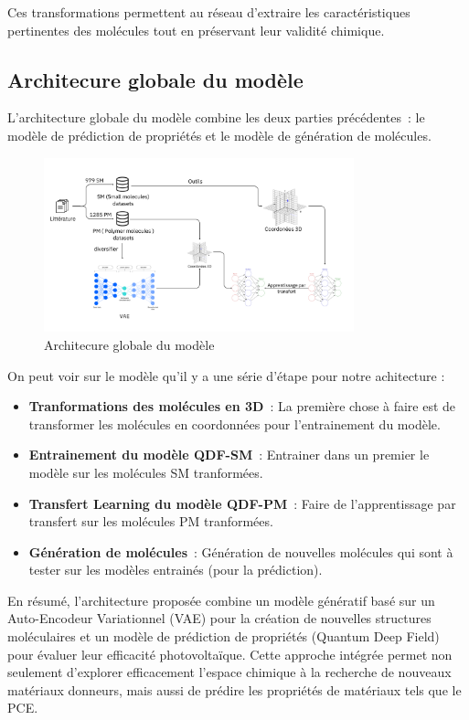 Ces transformations permettent au réseau d'extraire les caractéristiques pertinentes des molécules tout en préservant leur validité chimique.

\subsection{Architecure globale du modèle}

L'architecture globale du modèle combine les deux parties précédentes : le
modèle de prédiction de propriétés et le modèle de génération de molécules.

\begin{figure}[H]
    \centering
    \includegraphics[width=0.8\textwidth]{Architecture/global.png}
    \caption{Architecure globale du modèle}
\end{figure}

On peut voir sur le modèle qu'il y a une série d'étape pour notre achitecture :
\begin{itemize}
    \item \textbf{Tranformations des molécules en 3D} : La première chose à faire est de transformer les molécules en coordonnées pour l'entrainement du modèle.
    \item \textbf{Entrainement du modèle QDF-SM} : Entrainer dans un premier le modèle sur les molécules SM tranformées.
    \item \textbf{Transfert Learning du modèle QDF-PM} : Faire de l'apprentissage par transfert sur les molécules PM tranformées.
    \item \textbf{Génération de molécules} : Génération de nouvelles molécules qui sont à tester sur les modèles entrainés (pour la prédiction).
\end{itemize}

En résumé, l’architecture proposée combine un modèle génératif basé sur un Auto-Encodeur Variationnel (VAE) pour la création de nouvelles structures moléculaires et un modèle de prédiction de propriétés (Quantum Deep Field) pour évaluer leur efficacité photovoltaïque. 
Cette approche intégrée permet non seulement d’explorer efficacement l’espace chimique à la recherche de nouveaux matériaux donneurs, mais aussi de prédire les propriétés de matériaux tels que le PCE.